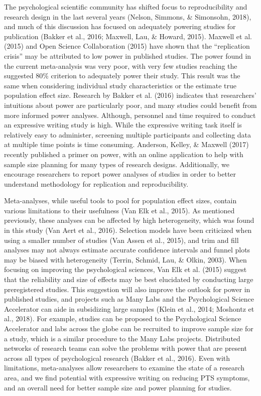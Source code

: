 \documentclass[man]{apa6}
\theoremstyle{definition}
\theoremstyle{definition}
\theoremstyle{definition}
\theoremstyle{remark}
\begin{document}
The psychological scientific community has shifted focus to
reproducibility and research design in the last several years (Nelson,
Simmons, \& Simonsohn, 2018), and much of this discussion has focused on
adequately powering studies for publication (Bakker et al., 2016;
Maxwell, Lau, \& Howard, 2015). Maxwell et al. (2015) and Open Science
Collaboration (2015) have shown that the \enquote{replication crisis}
may be attributed to low power in published studies. The power found in
the current meta-analysis was very poor, with very few studies reaching
the suggested 80\% criterion to adequately power their study. This
result was the same when considering individual study characteristics or
the estimate true population effect size. Research by Bakker et al.
(2016) indicates that researchers' intuitions about power are
particularly poor, and many studies could benefit from more informed
power analyses. Although, personnel and time required to conduct an
expressive writing study is high. While the expressive writing task
itself is relatively easy to administer, screening multiple participants
and collecting data at multiple time points is time consuming. Anderson,
Kelley, \& Maxwell (2017) recently published a primer on power, with an
online application to help with sample size planning for many types of
research designs. Additionally, we encourage researchers to report power
analyses of studies in order to better understand methodology for
replication and reproducibility.

Meta-analyses, while useful tools to pool for population effect sizes,
contain various limitations to their usefulness (Van Elk et al., 2015).
As mentioned previously, these analyses can be affected by high
heterogeneity, which was found in this study (Van Aert et al., 2016).
Selection models have been criticized when using a smaller number of
studies (Van Assen et al., 2015), and trim and fill analyses may not
always estimate accurate confidence intervals and funnel plots may be
biased with heterogeneity (Terrin, Schmid, Lau, \& Olkin, 2003). When
focusing on improving the psychological sciences, Van Elk et al. (2015)
suggest that the reliability and size of effects may be best elucidated
by conducting large preregistered studies. This suggestion will also
improve the outlook for power in published studies, and projects such as
Many Labs and the Psychological Science Accelerator can aide in
subsidizing large samples (Klein et al., 2014; Moshontz et al., 2018).
For example, studies can be proposed to the Psychological Science
Accelerator and labs across the globe can be recruited to improve sample
size for a study, which is a similar procedure to the Many Labs
projects. Distributed networks of research teams can solve the problems
with power that are present across all types of psychological research
(Bakker et al., 2016). Even with limitations, meta-analyses allow
researchers to examine the state of a research area, and we find
potential with expressive writing on reducing PTS symptoms, and an
overall need for better sample size and power planning for studies.
\end{document}
